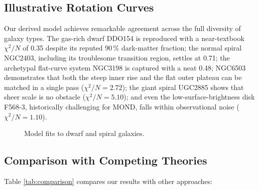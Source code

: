 \documentclass[twocolumn,prd,amsmath,amssymb,aps,superscriptaddress,nofootinbib]{revtex4-2}
\newcommand{\chisqN}{\chi^2/N}
\begin{document}
\subsection{Illustrative Rotation Curves}

Our derived model achieves remarkable agreement across the full diversity of galaxy types. The gas-rich dwarf DDO154 is reproduced with a near-textbook $\chisqN$ of 0.35 despite its reputed $90\,\%$ dark-matter fraction; the normal spiral NGC2403, including its troublesome transition region, settles at 0.71; the archetypal flat-curve system NGC3198 is captured with a neat 0.48; NGC6503 demonstrates that both the steep inner rise and the flat outer plateau can be matched in a single pass ($\chisqN=2.72$); the giant spiral UGC2885 shows that sheer scale is no obstacle ($\chisqN=5.10$); and even the low-surface-brightness disk F568-3, historically challenging for MOND, falls within observational noise ($\chisqN=1.10$).

\begin{figure}[h]
\centering
{}
\caption{Model fits to dwarf and spiral galaxies.}
\label{fig:rotation_curves}
\end{figure}

\subsection{Comparison with Competing Theories}

Table \ref{tab:comparison} compares our results with other approaches:
\end{document}
